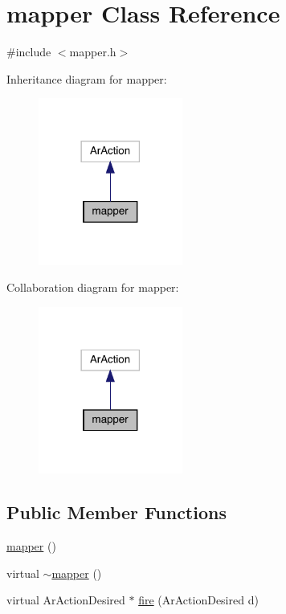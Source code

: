 \hypertarget{classmapper}{}\section{mapper Class Reference}
\label{classmapper}


{\ttfamily \#include $<$mapper.\+h$>$}



Inheritance diagram for mapper\+:\nopagebreak
\begin{figure}[H]
\begin{center}
\leavevmode
\includegraphics[width=134pt]{classmapper__inherit__graph}
\end{center}
\end{figure}


Collaboration diagram for mapper\+:\nopagebreak
\begin{figure}[H]
\begin{center}
\leavevmode
\includegraphics[width=134pt]{classmapper__coll__graph}
\end{center}
\end{figure}
\subsection*{Public Member Functions}
\begin{DoxyCompactItemize}
\item 
\hyperlink{classmapper_a63253379db55193ffc58434c32657270}{mapper} ()
\item 
virtual \hyperlink{classmapper_aab426a3eb8681cf2c1137f658a6802a4}{$\sim$mapper} ()
\item 
virtual Ar\+Action\+Desired $\ast$ \hyperlink{classmapper_a9d8bd0abf6844385c45d8b3ccd7b8e87}{fire} (Ar\+Action\+Desired d)
\end{DoxyCompactItemize}
